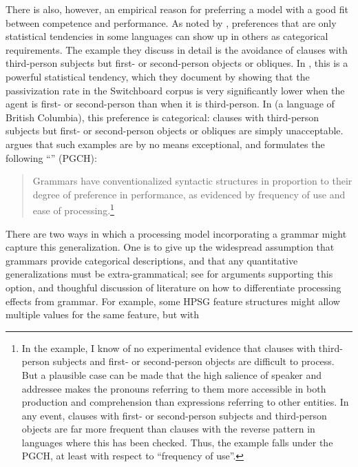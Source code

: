 \documentclass[output=paper
	        ,collection
	        ,collectionchapter
 	        ,biblatex
                ,babelshorthands
                ,newtxmath
                ,draftmode
                ,colorlinks, citecolor=brown
]{langscibook}
\begin{document}
There is also, however, an empirical reason for preferring a model with a good fit between competence and performance.  As noted by \citet{BresnanEtAl2001}, preferences that are only statistical tendencies in some languages can show up in others as categorical requirements.  The example they discuss in detail is the avoidance of clauses with third-person subjects but first- or second-person objects or obliques. In , this is a powerful statistical tendency, which they document by showing that the passivization rate in the Switchboard corpus is very significantly lower when the agent is first- or second-person than when it is third-person.  In  (a  language of British Columbia), this preference is categorical:  clauses with third-person subjects but first- or second-person objects or obliques are simply unacceptable.  \citet{Hawkins2004a-u,Hawkins2014} argues that such examples are by no means exceptional, and formulates the following ``'' (PGCH):
\begin{quote}
Grammars  have  conventionalized  syntactic  structures  in  proportion   to their degree of
preference in performance, as evidenced by frequency of use and ease of processing.\footnote{In the
  \citeauthor{BresnanEtAl2001} example, I know of no experimental evidence that clauses with
  third-person subjects and first- or second-person objects are difficult to process.  But a
  plausible case can be made that the high salience of speaker and addressee makes the pronouns
  referring to them more accessible in both production and comprehension than expressions referring
  to other entities.  In any event, clauses with first- or second-person subjects and third-person
  objects are far more frequent than clauses with the reverse pattern in languages where this has
  been checked.  Thus, the \citeauthor{BresnanEtAl2001} example falls under the PGCH, at least with
  respect to ``frequency of use''.}
\end{quote}
There are two ways in which a processing model incorporating a grammar might capture this
generalization.  One is to give up the widespread assumption that grammars provide categorical
descriptions, and that any quantitative generalizations must be extra-grammatical; see
\citet{FrancisPrep-b} for arguments supporting this option, and thoughful discussion of literature
on how to differentiate processing effects from grammar.  For example, some HPSG feature
structures might allow multiple values for the same feature, but with
\end{document}
